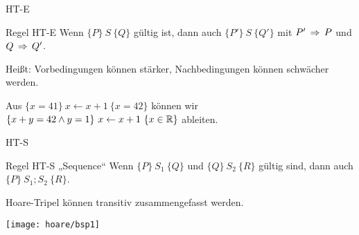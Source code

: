 \begin{frame}{HT-E}
	\begin{block}{Regel HT-E}
		Wenn $\{P\}\ S\ \{Q\}$ gültig ist, dann auch $\{P'\}\ S\ \{Q'\}$ mit $P' \impl P$ und $Q \impl  Q'$.
	\end{block}
	\pause
	Heißt: Vorbedingungen können stärker, Nachbedingungen können schwächer werden.

	\begin{Beispiel}
		Aus $\{ x = 41\} \ x \gets x + 1\ \{x = 42 \}$ können wir \\
		$\{ x + y = 42 \land y = 1 \} \ x \gets x + 1\ \{x \in \R \}$ ableiten.
	\end{Beispiel}
\end{frame}

\begin{frame}{HT-S}
	\begin{block}{Regel HT-S \quad „Sequence“}
		Wenn $\{P\}\ S_1\ \{Q\}$ und $\{Q\}\ S_2\ \{R\}$ gültig sind, dann auch $\{P\}\ S_1;  S_2\ \{R\}$. 
	\end{block}
	\pause
	\impl Hoare-Tripel können transitiv zusammengefasst werden.
\end{frame}

\begin{frame}
	\texttt{[image: hoare/bsp1]}
\end{frame}

